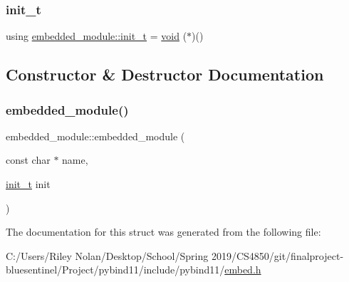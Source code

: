 \subsubsection{\texorpdfstring{init\_t}{init\_t}}
{\footnotesize\ttfamily using \mbox{\hyperlink{structembedded__module_ae88ae8eea3f77832186b09176e2277d3}{embedded\+\_\+module\+::init\+\_\+t}} =  \mbox{\hyperlink{_s_d_l__opengles2__gl2ext_8h_ae5d8fa23ad07c48bb609509eae494c95}{void}} ($\ast$)()}



\subsection{Constructor \& Destructor Documentation}
\mbox{\label{structembedded__module_adf4ff708284d6dc49a7cd5251260973e}} 
\subsubsection{\texorpdfstring{embedded\_module()}{embedded\_module()}}
{\footnotesize\ttfamily embedded\+\_\+module\+::embedded\+\_\+module (\begin{DoxyParamCaption}\item[{const char $\ast$}]{name,  }\item[{\mbox{\hyperlink{structembedded__module_ae88ae8eea3f77832186b09176e2277d3}{init\+\_\+t}}}]{init }\end{DoxyParamCaption})\hspace{0.3cm}{\ttfamily [inline]}}



The documentation for this struct was generated from the following file\+:\begin{DoxyCompactItemize}
\item 
C\+:/\+Users/\+Riley Nolan/\+Desktop/\+School/\+Spring 2019/\+C\+S4850/git/finalproject-\/bluesentinel/\+Project/pybind11/include/pybind11/\mbox{\hyperlink{embed_8h}{embed.\+h}}\end{DoxyCompactItemize}
